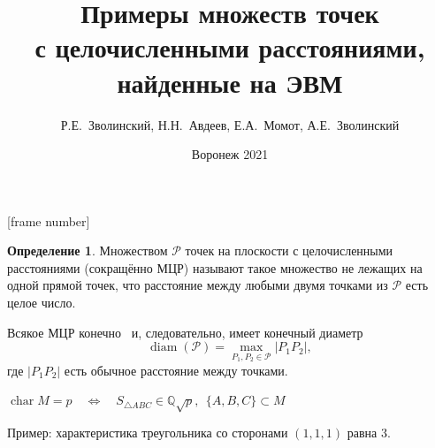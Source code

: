 \documentclass[10pt,pdf,hyperref={unicode},aspectratio=169]{beamer}
\theoremstyle{definition}
\newtheorem{ddefinition}[llemma]{Определение}
\begin{document}
\title{
	Примеры множеств точек\\с целочисленными расстояниями,\\найденные на ЭВМ
}
\author{Р.Е.~Зволинский, Н.Н.~Авдеев, Е.А.~Момот, А.Е.~Зволинский}
\date{Воронеж 2021}

\maketitle

[frame number]



\begin{frame}

	\begin{ddefinition}
		Множеством $\mathcal P$ точек на плоскости с целочисленными расстояниями (сокращённо МЦР) называют
		такое множество не лежащих на одной прямой точек, что расстояние между любыми двумя точками
		из $\mathcal P$ есть целое число.
	\end{ddefinition}

	\vfill

	Всякое МЦР конечно~\cite{bib:01, bib:02} и, следовательно, имеет конечный диаметр
	\begin{equation*}
	    \operatorname{diam} (\mathcal P) = \max_{P_1, P_2 \in \mathcal P}
	    |P_1 P_2|,
	\end{equation*}
	где $|P_1 P_2|$ есть обычное расстояние между точками.

	\vfill

	$\operatorname{char} M = p \quad \Leftrightarrow \quad S_{\triangle ABC} \in \mathbb{Q}\sqrt{p}, ~~ \{A,B,C\}\subset M$

	\vfill
	Пример: характеристика треугольника со сторонами $(1,1,1)$ равна $3$.

\end{frame}
\end{document}
